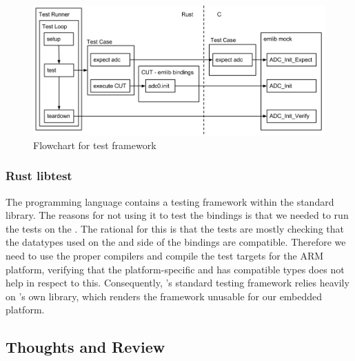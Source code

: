 \begin{figure}[H]
  \begin{center}
    \includegraphics[scale=0.3]{figures/testframework}
  \end{center}
  \caption{Flowchart for test framework}
  \label{fig:test-framework}
\end{figure}


\subsubsection{Rust libtest}

The {\rust} programming language contains a testing framework within the standard library.
The reasons for not using it to test the bindings is that we needed to run the tests on the {\gecko}.
The rational for this is that the tests are mostly checking that the datatypes used on the {\rust} and {\C} side of the bindings are compatible.
Therefore we need to use the proper compilers and compile the test targets for the ARM platform, verifying that the platform-specific  and {\rustc} has compatible types does not help in respect to this.
Consequently, {\rust}'s standard testing framework relies heavily on {\rust}'s own {\std} library, which renders the framework unusable for our embedded platform.



\subsection{Thoughts and Review}

